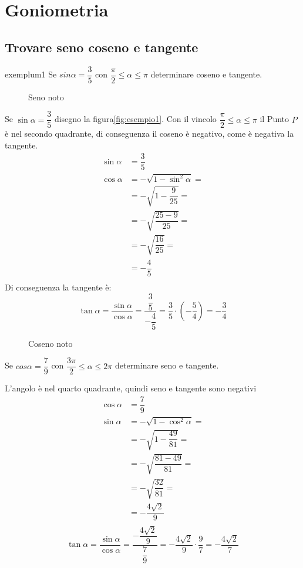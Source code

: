 \chapter{Goniometria}
\label{cha:goniometriaEss}
\section{Trovare seno coseno e tangente}
\begin{esempiot}{}{exemplum1}
	Se $sin\alpha=\dfrac{3}{5}$ con $\dfrac{\pi}{2}\leq\alpha\leq\pi$ determinare coseno e tangente.
\end{esempiot}
\begin{figure}
	\centering
	
	\captionsetup{format=esempio}
	\caption{Seno noto}\label{fig:esempio1}
\end{figure}
Se $\sin\alpha=\dfrac{3}{5}$ disegno la figura\nobs\vref{fig:esempio1}. Con il vincolo $\dfrac{\pi}{2}\leq\alpha\leq\pi$ il Punto $P$ è nel secondo quadrante, di conseguenza il coseno è negativo, come è negativa la tangente.
\begin{align*}
\sin\alpha&=\dfrac{3}{5}\\
\cos\alpha&=-\sqrt{1-\sin^2\alpha}=\\
&=-\sqrt{1-\dfrac{9}{25}}=\\
&=-\sqrt{\dfrac{25-9}{25}}=\\
&=-\sqrt{\dfrac{16}{25}}=\\
&=-\dfrac{4}{5}\\
\end{align*}
Di conseguenza la tangente è:
\[\tan\alpha=\dfrac{\sin\alpha}{\cos\alpha}=\dfrac{\dfrac{3}{5}}{-\dfrac{4}{5}}=\dfrac{3}{5}\cdot\left(-\dfrac{5}{4}\right)=-\dfrac{3}{4}\]
\begin{figure}
	\centering
	
	\captionsetup{format=esempio}
	\caption{Coseno noto}\label{fig:esempio2}
\end{figure}
\begin{esempiot}{}{}
	Se $cos\alpha=\dfrac{7}{9}$ con $\dfrac{3\pi}{2}\leq\alpha\leq 2\pi$ determinare seno e tangente.
\end{esempiot}
L'angolo è nel quarto quadrante, quindi seno e tangente sono negativi
\begin{align*}
\cos\alpha&=\dfrac{7}{9}\\
\sin\alpha&=-\sqrt{1-\cos^2\alpha}=\\
&=-\sqrt{1-\dfrac{49}{81}}=\\
&=-\sqrt{\dfrac{81-49}{81}}=\\
&=-\sqrt{\dfrac{32}{81}}=\\
&=-\dfrac{4\sqrt{2}}{9}\\
\end{align*}
\[\tan\alpha=\dfrac{\sin\alpha}{\cos\alpha}=\dfrac{-\dfrac{4\sqrt{2}}{9}}{\dfrac{7}{9}}=-\dfrac{4\sqrt{2}}{9}\cdot\dfrac{9}{7}=-\dfrac{4\sqrt{2}}{7}\]